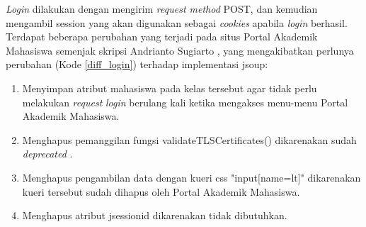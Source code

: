 \textit{Login} dilakukan dengan mengirim \textit{request method} POST, dan kemudian mengambil session yang akan digunakan sebagai \textit{cookies} apabila \textit{login} berhasil.
Terdapat beberapa perubahan yang terjadi pada situs Portal Akademik Mahasiswa semenjak skripsi Andrianto Sugiarto \cite{ifstupor}, yang mengakibatkan perlunya perubahan (Kode \ref{diff_login}) terhadap implementasi jsoup:

\begin{enumerate}
    \item Menyimpan atribut mahasiswa pada kelas tersebut agar tidak perlu melakukan \textit{request} \textit{login} berulang kali ketika mengakses menu-menu Portal Akademik Mahasiswa.
    \item Menghapus pemanggilan fungsi validateTLSCertificates() dikarenakan sudah \textit{deprecated} \cite{jsoup}.
    \item Menghapus pengambilan data dengan kueri css "input[name=lt]" dikarenakan kueri tersebut sudah dihapus oleh Portal Akademik Mahasiswa.
    \item Menghapus atribut jsessionid dikarenakan tidak dibutuhkan.
\end{enumerate}

